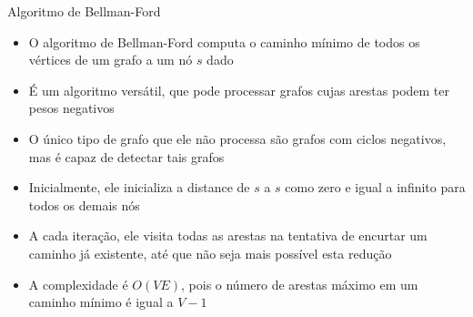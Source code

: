 \begin{frame}[fragile]{Algoritmo de Bellman-Ford}

    \begin{itemize}
        \item O algoritmo de Bellman-Ford computa o caminho mínimo de todos os vértices de
            um grafo a um nó $s$ dado

        \item É um algoritmo versátil, que pode processar grafos cujas arestas podem ter pesos
            negativos

        \item O único tipo de grafo que ele não processa são grafos com ciclos negativos,
            mas é capaz de detectar tais grafos

        \item Inicialmente, ele inicializa a distance de $s$ a $s$ como zero e igual a
            infinito para todos os demais nós

        \item A cada iteração, ele visita todas as arestas na tentativa de encurtar um
            caminho já existente, até que não seja mais possível esta redução

        \item A complexidade é $O(VE)$, pois o número de arestas máximo em um caminho mínimo é
            igual a $V - 1$
    \end{itemize}

\end{frame}

